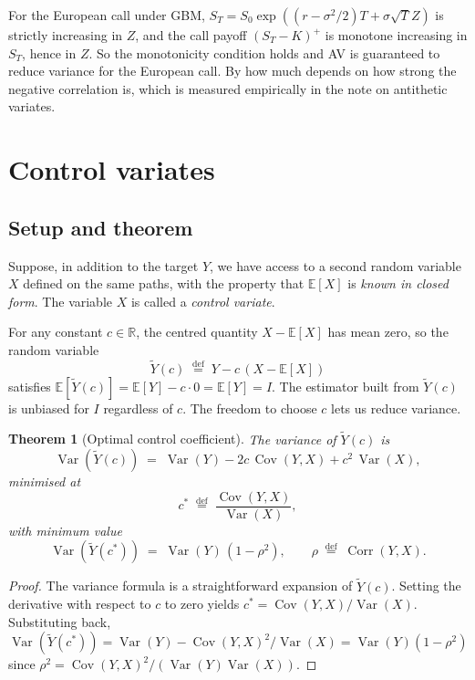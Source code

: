 \documentclass[11pt,a4paper]{article}
\theoremstyle{plain}
\newtheorem{theorem}{Theorem}[section]
\theoremstyle{definition}
\theoremstyle{remark}
\newcommand{\R}{\mathbb{R}}
\newcommand{\E}{\mathbb{E}}
\newcommand{\Var}{\operatorname{Var}}
\newcommand{\Cov}{\operatorname{Cov}}
\newcommand{\Corr}{\operatorname{Corr}}
\newcommand{\eqdef}{\overset{\mathrm{def}}{=}}
\begin{document}
For the European call under GBM, $S_T = S_0 \exp((r - \sigma^2/2) T
+ \sigma \sqrt{T} Z)$ is strictly increasing in $Z$, and the call
payoff $(S_T - K)^+$ is monotone increasing in $S_T$, hence in $Z$.
So the monotonicity condition holds and AV is guaranteed to reduce
variance for the European call. By how much depends on how strong the
negative correlation is, which is measured empirically in the note on
antithetic variates.

\section{Control variates}
\label{sec:cv}

\subsection{Setup and theorem}

Suppose, in addition to the target $Y$, we have access to a second
random variable $X$ defined on the same paths, with the property that
$\E[X]$ is \emph{known in closed form}. The variable $X$ is called a
\emph{control variate}.

For any constant $c \in \R$, the centred quantity $X - \E[X]$ has
mean zero, so the random variable
\begin{equation}
\label{eq:cv-Yi}
\tilde Y(c) \;\eqdef\; Y - c\,(X - \E[X])
\end{equation}
satisfies $\E[\tilde Y(c)] = \E[Y] - c \cdot 0 = \E[Y] = I$. The
estimator built from $\tilde Y(c)$ is unbiased for $I$ regardless of
$c$. The freedom to choose $c$ lets us reduce variance.

\begin{theorem}[Optimal control coefficient]
\label{thm:cv-optimal}
The variance of $\tilde Y(c)$ is
\begin{equation}
\Var(\tilde Y(c)) \;=\; \Var(Y) - 2c\,\Cov(Y, X) + c^2\,\Var(X),
\end{equation}
minimised at
\begin{equation}
\label{eq:cv-c-star}
c^* \;\eqdef\; \frac{\Cov(Y, X)}{\Var(X)},
\end{equation}
with minimum value
\begin{equation}
\label{eq:cv-min-var}
\Var(\tilde Y(c^*)) \;=\; \Var(Y)\,(1 - \rho^2),
\qquad \rho \;\eqdef\; \Corr(Y, X).
\end{equation}
\end{theorem}

\begin{proof}
The variance formula is a straightforward expansion of $\tilde
Y(c)$. Setting the derivative with respect to $c$ to zero yields
$c^* = \Cov(Y, X) / \Var(X)$. Substituting back,
$\Var(\tilde Y(c^*)) = \Var(Y) - \Cov(Y, X)^2 / \Var(X) = \Var(Y)(1
- \rho^2)$ since $\rho^2 = \Cov(Y, X)^2 / (\Var(Y) \Var(X))$.
\end{proof}
\end{document}

